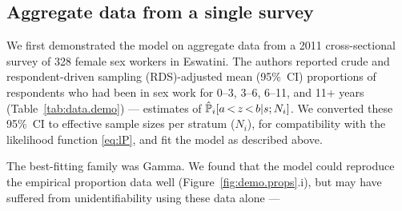 \subsection{Aggregate data from a single survey}
We first demonstrated the model on aggregate data from
a 2011 cross-sectional survey of 328 female sex workers in Eswatini.\cite{Baral2014}
The authors reported crude and respondent-driven sampling (RDS)-adjusted
mean (95\%~CI) proportions of respondents who had been in sex work for
0--3, 3--6, 6--11, and 11+ years (Table~\ref{tab:data.demo})
--- \ie estimates of $\hat{\mathbb{P}}_i[a\,{<}\,z\,{<}\,b|s;N_i]$.
We converted these 95\%~CI to effective sample sizes per stratum ($N_i$),
for compatibility with the likelihood function \eqref{eq:lP},
and fit the model as described above.
\begin{table}
  \centering
  \caption{RDS-adjusted proportions of durations in sex work
    reported by a 2011 sample of female sex workers in Eswatini
    (N = 313) \cite{Baral2014}}
  \label{tab:data.demo}
  
\end{table}
\par
The best-fitting family was Gamma.
We found that the model could reproduce the empirical proportion data well
(Figure~\ref{fig:demo.props}.i),
but may have suffered from unidentifiability using these data alone --- \ie
